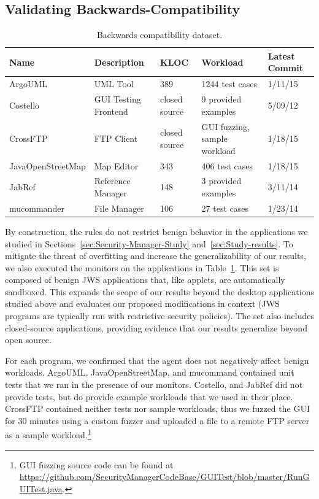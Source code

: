\documentclass{sig-alternate-05-2015}
\begin{document}
\subsection{Validating Backwards-Compatibility}\label{sec:backcompat}
\begin{table}
\caption{\label{tab:validation-programs}
Backwards compatibility dataset.}
\centering

\begin{tabular}{lllll}
\toprule 
\textbf{Name} & \textbf{Description} & \textbf{KLOC} & \textbf{Workload} & \textbf{Latest Commit}\tabularnewline
\midrule
ArgoUML & UML Tool & 389 & 1244 test cases & 1/11/15 \tabularnewline
Costello & GUI Testing Frontend & closed source & 9 provided examples & 5/09/12 \tabularnewline
CrossFTP & FTP Client & closed source & GUI fuzzing, sample workload & 1/18/15 \tabularnewline
JavaOpenStreetMap & Map Editor & 343 & 406 test cases & 1/18/15 \tabularnewline
JabRef & Reference Manager & 148 & 3 provided examples & 3/11/14 \tabularnewline 
mucommander & File Manager & 106 & 27 test cases & 1/23/14 \tabularnewline
\bottomrule
\end{tabular}
\vspace{-0.5cm}
\end{table}

By construction, the rules do not restrict
benign behavior in the applications we studied in
Sections~\ref{sec:Security-Manager-Study} and~\ref{sec:Study-results}. To mitigate the threat of overfitting and increase the generalizability of our results, we 
also executed the monitors on the applications
in Table~\ref{tab:validation-programs}. This set is composed of benign JWS
applications that, like applets, are automatically sandboxed.  This
expands the scope of our results beyond the desktop applications
studied above and evaluates our proposed modifications in 
context (JWS programs are typically run with restrictive
security policies).  The set also includes closed-source applications,
providing evidence that our results generalize beyond open
source.

For each program, we confirmed that the agent does not negatively affect benign workloads. ArgoUML, JavaOpenStreetMap, and mucommand 
contained unit tests that we ran in the presence of our monitors. Costello, and
JabRef did not provide tests, but do provide example workloads that we used
in their place. CrossFTP contained neither tests nor sample workloads, thus
we fuzzed the GUI for 30 minutes using a custom fuzzer and uploaded a file to a
remote FTP server as a sample workload.\footnote{GUI fuzzing source code
can be found at
\url{https://github.com/SecurityManagerCodeBase/GUITest/blob/master/RunGUITest.java}.} 
\end{document}
